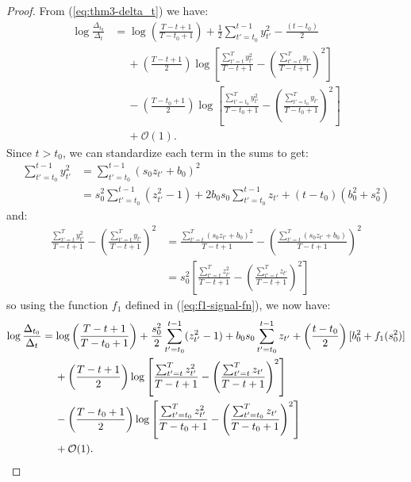 \begin{proof}
From (\ref{eq:thm3-delta_t}) we have:
\begin{align*}
    \log \frac{\Delta_{t_0}}{\Delta_t} &= \log \left(\frac{T - t + 1}{T - t_0 +1} \right) + \frac{1}{2} \sum_{t' = t_0}^{t - 1} y_{t'}^2 - \frac{(t-t_0)}{2} \\
    &\quad\: + \left(\frac{T - t +1}{2}\right)\log\left[\frac{\sum_{t'=t}^T y_{t'}^2}{T-t+1} - \left(\frac{\sum_{t'=t}^T y_{t'}}{T-t+1}\right)^2 \right] \\
    &\quad\: -\left(\frac{T - t_0 +1}{2}\right)\log\left[\frac{\sum_{t'=t_0}^T y_{t'}^2}{T-t_0+1} - \left(\frac{\sum_{t'=t_0}^T y_{t'}}{T-t_0+1}\right)^2 \right] \\
    &\quad\: + \mathcal{O}(1).
\end{align*}
Since $t > t_0$, we can standardize each term in the sums to get:
\begin{align*}
    \sum_{t' = t_0}^{t - 1} y_{t'}^2 &= \sum_{t' = t_0}^{t - 1} (s_0z_{t'} + b_0)^2 \\
    &= s_0^2 \sum_{t' = t_0}^{t - 1} (z_{t'}^2 -1) + 2 b_0 s_0 \sum_{t' = t_0}^{t - 1} z_{t'} + (t-t_0)(b_0^2 +s_0^2)
\end{align*}
and:
\begin{align*}
    \frac{\sum_{t'=t}^T y_{t'}^2}{T-t+1} - \left(\frac{\sum_{t'=t}^T y_{t'}}{T-t+1}\right)^2 &= \frac{\sum_{t'=t}^T (s_0z_{t'} + b_0)^2}{T-t+1} - \left(\frac{\sum_{t'=t}^T (s_0z_{t'} + b_0)}{T-t+1}\right)^2 \\
    &= s_0^2 \left[\frac{\sum_{t'=t}^T z_{t'}^2}{T-t+1} - \left(\frac{\sum_{t'=t}^T z_{t'}}{T-t+1}\right)^2\right]
\end{align*}
so using the function $f_1$ defined in (\ref{eq:f1-signal-fn}), we now have:
\begin{align}
    \log \frac{\Delta_{t_0}}{\Delta_t} &= \log \left(\frac{T - t + 1}{T - t_0 +1} \right) + \frac{s_0^2}{2} \sum_{t' = t_0}^{t - 1} (z_{t'}^2-1) + b_0 s_0 \sum_{t' = t_0}^{t - 1} z_{t'} + \left(\frac{t-t_0}{2}\right)[b_0^2+ f_1(s_0^2)] \notag \\
    &\quad\: + \left(\frac{T - t +1}{2}\right)\log\left[\frac{\sum_{t'=t}^T z_{t'}^2}{T-t+1} - \left(\frac{\sum_{t'=t}^T z_{t'}}{T-t+1}\right)^2\right] \notag \\
    &\quad\: -\left(\frac{T - t_0 +1}{2}\right)\log\left[\frac{\sum_{t'=t_0}^T z_{t'}^2}{T-t_0+1} - \left(\frac{\sum_{t'=t_0}^T z_{t'}}{T-t_0+1}\right)^2\right] \notag \\
    &\quad\: + \mathcal{O}(1). \label{eq:thm3-cs1-bd0}
\end{align}

\end{proof}
